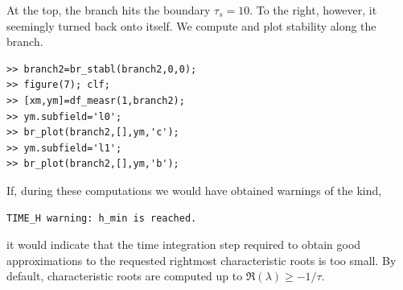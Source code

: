 \documentclass[10pt]{article}
\begin{document}
{At the top, the branch hits the boundary $\tau_s=10$. To the right, however,
it seemingly turned back onto itself.
We compute and plot stability along the branch.
{\small\begin{verbatim}
>> branch2=br_stabl(branch2,0,0);
>> figure(7); clf;
>> [xm,ym]=df_measr(1,branch2);
>> ym.subfield='l0';
>> br_plot(branch2,[],ym,'c');
>> ym.subfield='l1';
>> br_plot(branch2,[],ym,'b');
\end{verbatim}}
If, during these computations we would have obtained warnings of the kind,
{\small\begin{verbatim}
TIME_H warning: h_min is reached.
\end{verbatim}}
\noindent it would indicate that the time integration step required to obtain good
approximations to the requested rightmost characteristic roots 
is too small.
By default, characteristic roots are computed 
up to $\Re(\lambda)\geq-1/\tau$.

}
\end{document}
